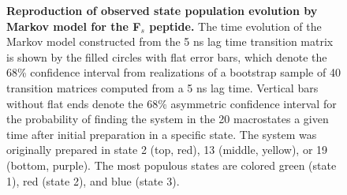 \begin{figure}[tb]
  \begin{center}
  \end{center}
  \caption{{\bf Reproduction of observed state population evolution by Markov model for the F$_s$ peptide.} 
  The time evolution of the Markov model constructed from the 5 ns lag time transition matrix is shown by the filled circles with flat error bars, which denote the 68\% confidence interval from realizations of a bootstrap sample of 40 transition matrices computed from a 5 ns lag time.
  Vertical bars without flat ends denote the 68\% asymmetric confidence interval for the probability of finding the system in the 20 macrostates a given time after initial preparation in a specific state.
  The system was originally prepared in state 2 (top, red), 13 (middle, yellow), or 19 (bottom, purple).
  The most populous states are colored green (state 1), red (state 2), and blue (state 3).
  }
  \label{automatic:figure:fs-time-evolution}
\end{figure}


